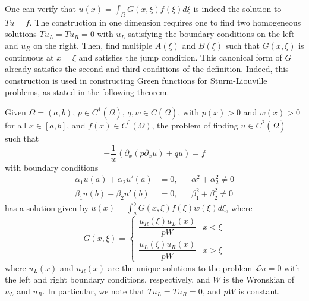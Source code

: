 One can verify that $u(x)=\int_{\Omega}G(x,\xi)f(\xi)d\xi$ is indeed the solution to $Tu=f$. The construction in one dimension requires one to find two homogeneous solutions $Tu_L = Tu_R = 0$ with $u_L$ satisfying the boundary conditions on the left and $u_R$ on the right. Then, find multiple $A(\xi)$ and $B(\xi)$ such that $G(x,\xi)$ is continuous at $x=\xi$ and satisfies the jump condition. This canonical form of $G$ already satisfies the second and third conditions of the definition. Indeed, this construction is used in constructing Green functions for Sturm-Liouville problems, as stated in the following theorem. 
\begin{theorem}\label{thm:green-functions-regular-sturm-liouville}
Given $\Omega=(a,b)$, $p\in C^{1}(\overline{\Omega})$, $q, w \in C(\overline{\Omega})$, with $p(x)>0$ and $w(x)>0$ for all $x\in[a,b]$, and $f(x)\in C^{0}(\Omega)$, the problem of finding $u\in C^{2}(\overline{\Omega})$ such that 
\begin{equation*}
    -\frac{1}{w}(\partial_{x}(p\partial_{x}u)+qu)=f
\end{equation*}
with boundary conditions
\begin{equation*}
    \begin{aligned}
        \alpha_{1}u(a)+\alpha_{2}u'(a)&=0, && \alpha_{1}^{2}+\alpha_{2}^{2}\ne0\\
        \beta_{1}u(b)+\beta_{2}u'(b)&=0, && \beta_{1}^{2}+\beta_{2}^{2}\ne0
    \end{aligned}
\end{equation*}
has a solution given by $u(x)=\int_{a}^{b}G(x,\xi)f(\xi)w(\xi)d\xi$, where
\begin{equation}
    G(x,\xi)=\begin{cases} \dfrac{u_R(\xi)u_L(x)}{pW} & x < \xi \\ \dfrac{u_L(\xi)u_R(x)}{pW} & x > \xi \end{cases}
\end{equation}
where $u_L(x)$ and $u_R(x)$ are the unique solutions to the problem $\mathcal{L}u=0$ with the left and right boundary conditions, respectively, and $W$ is the Wronskian of $u_L$ and $u_R$. In particular, we note that $Tu_L = Tu_R = 0$, and $pW$ is constant. 
\end{theorem}

